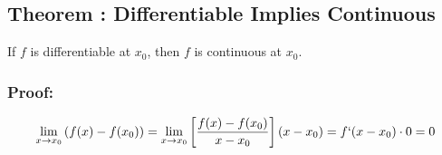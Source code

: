 \subsection*{Theorem : Differentiable Implies Continuous}
If $f$ is differentiable at $x_0$, then $f$ is continuous at $x_0$.

\subsubsection*{Proof:} 

\begin{equation*}
\lim_{x \to x_0} \left( f(x) - f(x_0) \right)
	= \lim_{x \to x_0} \left[ \frac{f(x) - f(x_0)}{x-x_0} \right] (x - x_0) = f`(x-x_0) \cdot 0 = 0 
\end{equation*}
